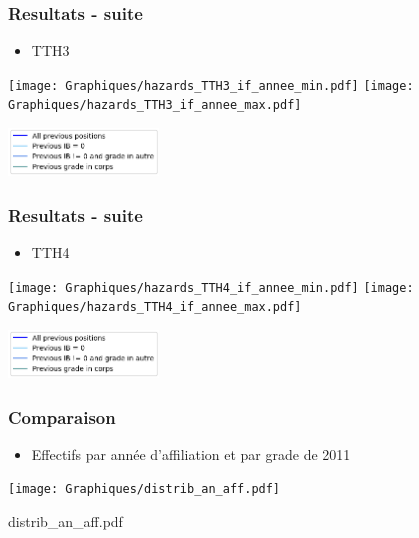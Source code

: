 \documentclass[xcolor=table,ignorenonframetext,12pt]{beamer}
\begin{document}
\begin{frame}
\frametitle{Resultats - suite}
\begin{itemize}
	\item TTH3
\end{itemize}
\begin{center}
	\texttt{[image: Graphiques/hazards\_TTH3\_if\_annee\_min.pdf]}
	\texttt{[image: Graphiques/hazards\_TTH3\_if\_annee\_max.pdf]}
\end{center}
\begin{center}
	\includegraphics[width=0.3\textwidth]{Graphiques/legend.png}
\end{center}

\end{frame}

\begin{frame}
\frametitle{Resultats - suite}
\begin{itemize}
	\item TTH4
\end{itemize}
\begin{center}
	\texttt{[image: Graphiques/hazards\_TTH4\_if\_annee\_min.pdf]}
	\texttt{[image: Graphiques/hazards\_TTH4\_if\_annee\_max.pdf]}
\end{center}
\begin{center}
	\includegraphics[width=0.3\textwidth]{Graphiques/legend.png}
\end{center}

\end{frame}


\begin{frame}
\frametitle{Comparaison}
\begin{itemize}
	\item Effectifs par année d'affiliation et par grade de 2011
\end{itemize}
\begin{center}
	\texttt{[image: Graphiques/distrib\_an\_aff.pdf]}
\end{center}


\end{frame}

distrib_an_aff.pdf
\end{document}
